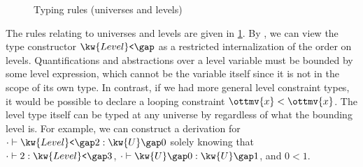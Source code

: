 \documentclass[a4paper,UKenglish,cleveref,autoref,thm-restate]{lipics-v2021}
\begin{document}
\begin{figure}
\caption{Typing rules (universes and levels)}
\label{fig:typing:univ}
\end{figure}

The rules relating to universes and levels are given in \cref{fig:typing:univ}.
By , we can view the type constructor $ \kw{Level}\texttt{<} \gap   \relax  $
as a restricted internalization of the order on levels.
Quantifications and abstractions over a level variable
must be bounded by some level expression,
which cannot be the variable itself since it is not in the scope of its own type.
In contrast, if we had more general level constraint types,
it would be possible to declare a looping constraint $\ottmv{x} < \ottmv{x}$.
The level type itself can be typed at any universe by 
regardless of what the bounding level is.
For example, we can construct a derivation for $  \cdot   \vdash   \kw{Level}\texttt{<} \gap   2    \mathrel{:}   \kw{U} \gap   0   $
solely knowing that $  \cdot   \vdash   2   \mathrel{:}   \kw{Level}\texttt{<} \gap   3   $, $  \cdot   \vdash   \kw{U} \gap   0    \mathrel{:}   \kw{U} \gap   1   $, and $ 0  <  1 $.
\end{document}
